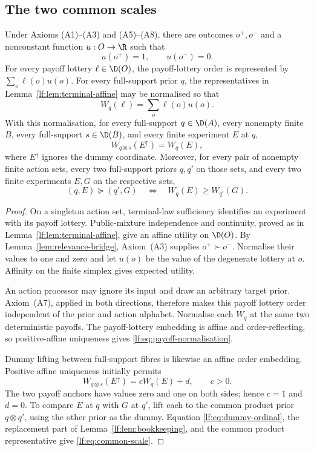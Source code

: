 \subsection{The two common scales}

\begin{lemma}\label{lf:lem:material-scale}
Under Axioms \textup{(A1)--(A3)} and
\textup{(A5)--(A8)}, there are outcomes $o^+,o^-$ and a
nonconstant function $u:O\to\R$ such that
\[
u(o^+)=1,
\qquad
u(o^-)=0.
\]
For every payoff lottery $\ell\in\D(O)$, the payoff-lottery order is represented
by $\sum_o\ell(o)u(o)$.  For every full-support prior $q$, the representatives
in Lemma~\ref{lf:lem:terminal-affine} may be normalised so that
\begin{equation}
W_q(\ell)=\sum_o\ell(o)u(o).
\label{lf:eq:payoff-normalisation}
\end{equation}
With this normalisation, for every full-support $q\in\D(A)$, every nonempty
finite $B$, every full-support $s\in\D(B)$, and every finite experiment $E$ at
$q$,
\[
W_{q\otimes s}(E^\uparrow)=W_q(E),
\]
where $E^\uparrow$ ignores the dummy coordinate.  Moreover, for every pair of nonempty
finite action sets, every two full-support priors $q,q'$ on those sets, and
every two finite experiments $E,G$ on the respective sets,
\begin{equation}
(q,E)\succeq(q',G)
\quad\Longleftrightarrow\quad
W_q(E)\ge W_{q'}(G).
\label{lf:eq:common-scale}
\end{equation}
\end{lemma}

\begin{proof}
On a singleton action set, terminal-law sufficiency identifies an experiment
with its payoff lottery.  Public-mixture independence and continuity, proved as
in Lemma~\ref{lf:lem:terminal-affine}, give an affine utility on $\D(O)$.
By Lemma~\ref{lem:relevance-bridge}, Axiom~\textup{(A3)} supplies
$o^+\succ o^-$.  Normalise their values to one
and zero and let $u(o)$ be the value of the degenerate lottery at $o$.
Affinity on the finite simplex gives expected utility.

An action processor may ignore its input and draw an arbitrary target prior.
Axiom~\textup{(A7)}, applied in both directions, therefore makes this payoff
lottery order independent of the prior and action alphabet.  Normalise each
$W_q$ at the same two deterministic payoffs.  The payoff-lottery embedding is
affine and order-reflecting, so positive-affine uniqueness gives
\eqref{lf:eq:payoff-normalisation}.

Dummy lifting between full-support fibres is likewise an affine order
embedding.  Positive-affine uniqueness initially permits
\[
W_{q\otimes s}(E^\uparrow)=cW_q(E)+d,
\qquad c>0.
\]
The two payoff anchors have values zero and one on both sides; hence $c=1$ and
$d=0$.  To compare $E$ at $q$ with $G$ at $q'$, lift each to the common product
prior $q\otimes q'$, using the other prior as the dummy.  Equation
\eqref{lf:eq:dummy-ordinal}, the replacement part of
Lemma~\ref{lf:lem:bookkeeping}, and the common product representative give
\eqref{lf:eq:common-scale}.
\end{proof}

